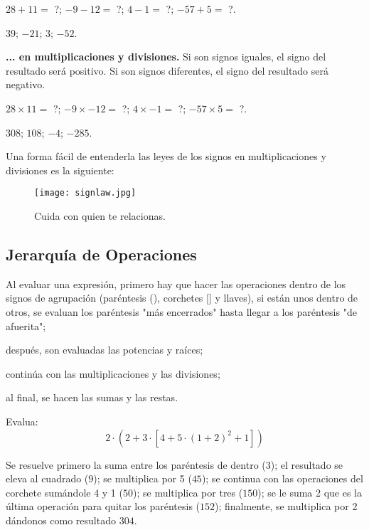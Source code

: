 \begin{example}
    $28+11 =$ ?;
    $-9-12 =$ ?;
    $4-1 =$ ?;
    $-57+5 =$ ?.
\end{example}

$39$; $-21$; $3$; $-52$. 

\textbf{... en multiplicaciones y divisiones.} Si son signos 
iguales, el signo del resultado será positivo. Si son signos 
diferentes, el signo del resultado será negativo.

\begin{example}
    $28\times 11 =$ ?;
    $-9\times -12 =$ ?;
    $4\times -1 =$ ?;
    $-57\times 5 =$ ?.
\end{example}

$308$; $108$; $-4$; $-285$. 

Una forma fácil de entenderla las leyes de los signos en 
multiplicaciones y divisiones es la siguiente:

\begin{figure}
    \centering
    \texttt{[image: signlaw.jpg]}
    \caption{Cuida con quien te relacionas.}
\end{figure}

\subsection{Jerarquía de Operaciones}

\begin{enumerate}
    \ii Al evaluar una expresión, primero hay que hacer las 
    operaciones dentro de los signos de agrupación (paréntesis (), 
    corchetes [] y llaves${}$), si están unos dentro de otros, 
    se evaluan los paréntesis "más encerrados" 
    hasta llegar a los paréntesis "de afuerita";

    \ii después, son evaluadas las potencias y raíces;

    \ii continúa con las multiplicaciones y las divisiones;

    \ii al final, se hacen las sumas y las restas.
\end{enumerate}

\begin{example}
    Evalua: 
    \[2\cdot\left(2+3\cdot\left[4+5\cdot\left(1+2\right)^2+1\right]\right) \]
\end{example}

Se resuelve primero la suma entre los paréntesis de dentro ($3$); 
el resultado se eleva al cuadrado ($9$); 
se multiplica por 5 ($45$); 
se continua con las operaciones del corchete sumándole 4 y 1 ($50$);
se multiplica por tres ($150$);
se le suma 2 que es la última operación para quitar los paréntesis ($152$);
finalmente, se multiplica por 2 dándonos como resultado $304$.

